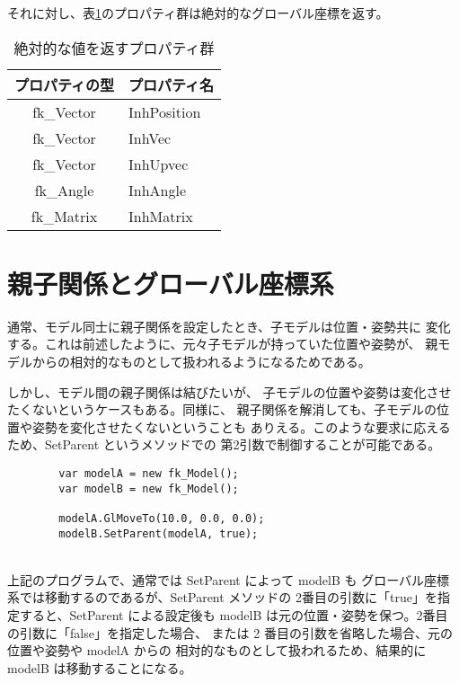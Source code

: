 それに対し、表\ref{tbl:fkInh2}のプロパティ群は絶対的なグローバル座標を返す。

\begin{table}[H]
\caption{絶対的な値を返すプロパティ群}
\label{tbl:fkInh2}
\begin{center}
\begin{tabular}{|c|l|}
\hline
プロパティの型 & プロパティ名 \\ \hline \hline
fk\_Vector & InhPosition \\ \hline
fk\_Vector & InhVec \\ \hline
fk\_Vector & InhUpvec \\ \hline
fk\_Angle & InhAngle \\ \hline
fk\_Matrix & InhMatrix \\ \hline
\end{tabular}
\end{center}
\end{table}

\section{親子関係とグローバル座標系} \label{sec:modelglobal}
通常、モデル同士に親子関係を設定したとき、子モデルは位置・姿勢共に
変化する。これは前述したように、元々子モデルが持っていた位置や姿勢が、
親モデルからの相対的なものとして扱われるようになるためである。

しかし、モデル間の親子関係は結びたいが、
子モデルの位置や姿勢は変化させたくないというケースもある。同様に、
親子関係を解消しても、子モデルの位置や姿勢を変化させたくないということも
ありえる。このような要求に応えるため、SetParent というメソッドでの
第2引数で制御することが可能である。
\\
\begin{breakbox}
\begin{verbatim}
        var modelA = new fk_Model();
        var modelB = new fk_Model();

        modelA.GlMoveTo(10.0, 0.0, 0.0);
        modelB.SetParent(modelA, true);
\end{verbatim}
\end{breakbox}
~ \\
上記のプログラムで、通常では SetParent によって modelB も
グローバル座標系では移動するのであるが、SetParent メソッドの
2番目の引数に「true」を指定すると、SetParent による設定後も
modelB は元の位置・姿勢を保つ。2番目の引数に「false」を指定した場合、
または 2 番目の引数を省略した場合、元の位置や姿勢や modelA からの
相対的なものとして扱われるため、結果的に modelB は移動することになる。

